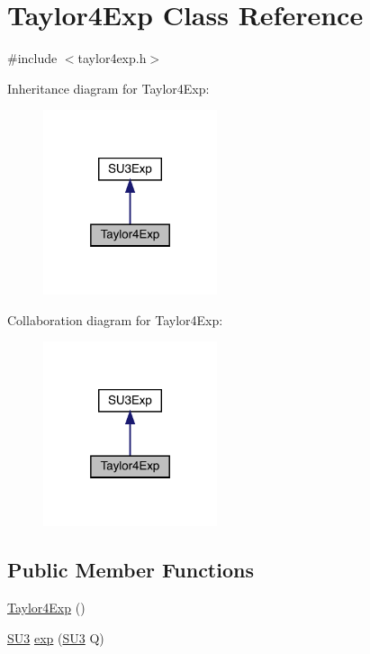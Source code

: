 \hypertarget{class_taylor4_exp}{}\section{Taylor4\+Exp Class Reference}
\label{class_taylor4_exp}


{\ttfamily \#include $<$taylor4exp.\+h$>$}



Inheritance diagram for Taylor4\+Exp\+:\nopagebreak
\begin{figure}[H]
\begin{center}
\leavevmode
\includegraphics[width=145pt]{class_taylor4_exp__inherit__graph}
\end{center}
\end{figure}


Collaboration diagram for Taylor4\+Exp\+:\nopagebreak
\begin{figure}[H]
\begin{center}
\leavevmode
\includegraphics[width=145pt]{class_taylor4_exp__coll__graph}
\end{center}
\end{figure}
\subsection*{Public Member Functions}
\begin{DoxyCompactItemize}
\item 
\mbox{\hyperlink{class_taylor4_exp_a0eac1c3288d296110c6a5e11acc0934d}{Taylor4\+Exp}} ()
\item 
\mbox{\hyperlink{class_s_u3}{S\+U3}} \mbox{\hyperlink{class_taylor4_exp_a08f0d6d994f45b23b401b5cdc260e7ae}{exp}} (\mbox{\hyperlink{class_s_u3}{S\+U3}} Q)
\end{DoxyCompactItemize}


